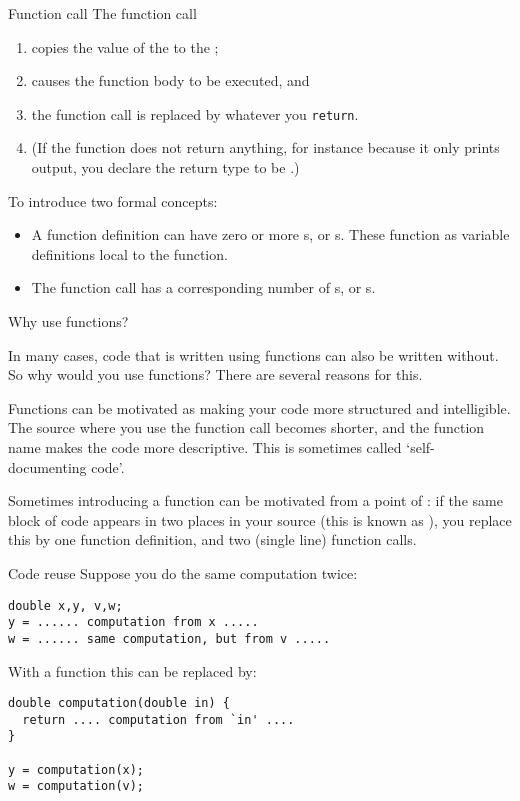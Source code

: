 \begin{block}{Function call}
  \label{sl:func-call}
  The function call
  \begin{enumerate}
  \item copies the value of the 
    to the ;
  \item causes the function body to be executed, and
  \item the function call is replaced by whatever you \lstinline{return}.
  \item (If the function does not return anything, for instance because
    it only prints output, you declare the return type to be .)
  \end{enumerate}
\end{block}

To introduce two formal concepts:
\begin{itemize}
\item A function definition can have zero or more s,
  or s.
  These function as variable definitions local to the function.
\item The function call has a corresponding number of s,
  or s.
\end{itemize}

 {Why use functions?}

In many cases, code that is written using functions can also be
written without. So why would you use functions? There are several
reasons for this.

Functions can be motivated as making your code more structured and intelligible.
The source where you use the function call becomes shorter,
and the function
name makes the code more descriptive. This is sometimes called
`self-documenting code'.

Sometimes introducing a function can be motivated from a point of
: if the same block of code appears in two
places in your source (this is known as
), you replace this by one function
definition, and two (single line) function calls.

\begin{block}{Code reuse}
  \label{sl:reuse}
Suppose you do the same computation twice:
\begin{lstlisting}
double x,y, v,w;
y = ...... computation from x .....
w = ...... same computation, but from v .....
\end{lstlisting}
With a function this can be replaced by:
\begin{lstlisting}
double computation(double in) {
  return .... computation from `in' ....
}

y = computation(x);
w = computation(v);
\end{lstlisting}
\end{block}

